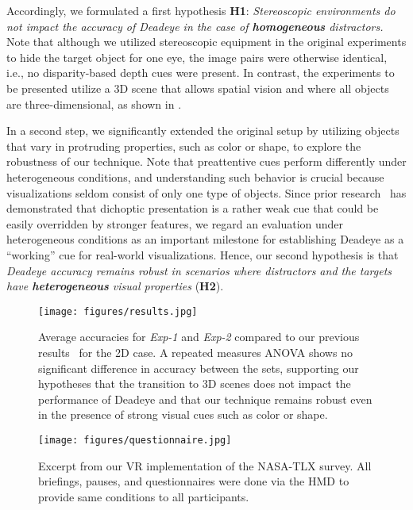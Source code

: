 \documentclass[journal]{vgtc}                %
\begin{document}
Accordingly, we formulated a first hypothesis \textbf{H1}: \textit{Stereoscopic environments do not impact the accuracy of Deadeye in the case of \textbf{homogeneous} distractors.} Note that although we utilized stereoscopic equipment in the original experiments to hide the target object for one eye, the image pairs were otherwise identical, i.e., no disparity-based depth cues were present. In contrast, the experiments to be presented utilize a 3D scene that allows spatial vision and where all objects are three-dimensional, as shown in . 



In a second step, we significantly extended the original setup by utilizing objects that vary in protruding properties, such as color or shape, to explore the robustness of our technique. Note that preattentive cues perform differently under heterogeneous conditions, and understanding such behavior is crucial because visualizations seldom consist of only one type of objects. Since prior research~\cite{zou2017binocularity} has demonstrated that dichoptic presentation is a rather weak cue that could be easily overridden by stronger features, we regard an evaluation under heterogeneous conditions as an important milestone for establishing Deadeye as a ``working'' cue for real-world visualizations. Hence, our second hypothesis is that \textit{Deadeye accuracy remains robust in scenarios where distractors and the targets have \textbf{heterogeneous} visual properties} (\textbf{H2}). 


\begin{figure*}[!t]
\centering
\texttt{[image: figures/results.jpg]}
\caption{Average accuracies for \textit{Exp-1} and \textit{Exp-2} compared to our previous results~\cite{krekhov2019deadeye} for the 2D case. A repeated measures ANOVA shows no significant difference in accuracy between the sets, supporting our hypotheses that the transition to 3D scenes does not impact the performance of Deadeye and that our technique remains robust even in the presence of strong visual cues such as color or shape.}
\label{fig:results}
\end{figure*}



\begin{figure}[!b]
\centering
\texttt{[image: figures/questionnaire.jpg]}
\caption{Excerpt from our VR implementation of the NASA-TLX survey. All briefings, pauses, and questionnaires were done via the HMD to provide same conditions to all participants.}
\label{fig:questionnaire}
\end{figure}
\end{document}
